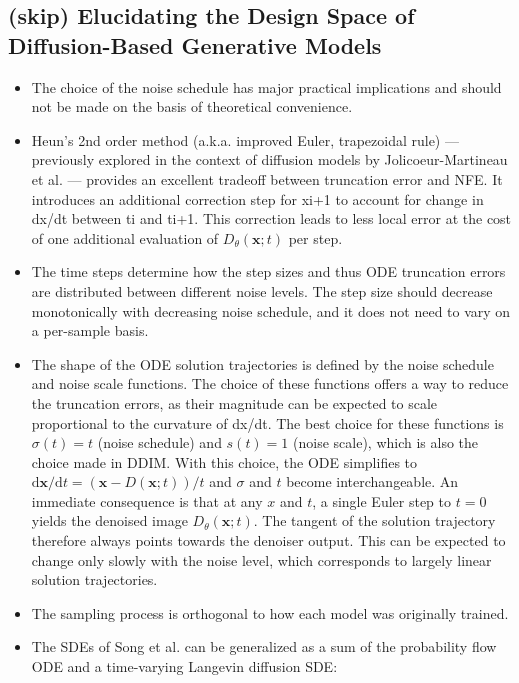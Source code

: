 \documentclass{article}
\begin{document}
\subsection{(skip) Elucidating the Design Space of Diffusion-Based Generative Models}
\begin{itemize}
    \item The choice of the noise schedule has major practical implications and should not be made on the basis of theoretical convenience.
    \item Heun's 2nd order method (a.k.a. improved Euler, trapezoidal rule) — previously explored in the context of diffusion models by Jolicoeur-Martineau et al. — provides an excellent tradeoff between truncation error and NFE. It introduces an additional correction step for xi+1 to account for change  in dx/dt between ti and ti+1. This correction leads to less local error at the cost of one additional evaluation of $D_\theta(\boldsymbol{x} ; t)$ per step.
    \item The time steps determine how the step sizes and thus ODE truncation errors are distributed between different noise levels. The step size should decrease monotonically with decreasing noise schedule, and it does not need to vary on a per-sample basis.
    \item The shape of the ODE solution trajectories is defined by the noise schedule and noise scale functions. The choice of these functions offers a way to reduce the truncation errors, as their magnitude can be expected to scale proportional to the curvature of dx/dt. The best choice for these functions is $\sigma(t)=t$ (noise schedule) and $s(t)=1$ (noise scale), which is also the choice made in DDIM. With this choice, the ODE simplifies to $\mathrm{d} \boldsymbol{x} / \mathrm{d} t=(\boldsymbol{x}-D(\boldsymbol{x} ; t)) / t$ and $\sigma$ and $t$ become interchangeable.  An immediate consequence is that at any $x$ and $t$, a single Euler step to $t = 0 $ yields the denoised image $D_\theta(\boldsymbol{x} ; t)$. The tangent of the solution trajectory therefore always points towards the denoiser output. This can be expected to change only slowly with the noise level, which corresponds to largely linear solution trajectories.
    \item The sampling process is orthogonal to how each model was originally trained.
    \item The SDEs of Song et al. can be generalized as a sum of the probability flow ODE and a time-varying Langevin diffusion SDE:

\end{itemize}
\end{document}
